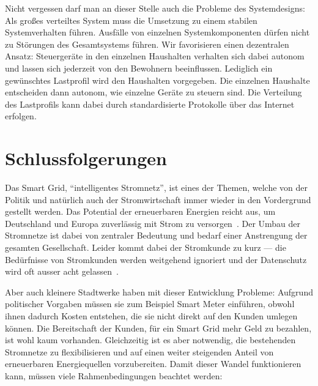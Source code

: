 \documentclass[12pt,BCOR=8.5mm]{scrartcl}
\begin{document}
Nicht vergessen darf man an dieser Stelle auch die Probleme des Systemdesigns:
Als großes verteiltes System muss die Umsetzung zu einem stabilen
Systemverhalten führen. Ausfälle von einzelnen Systemkomponenten dürfen
nicht zu Störungen des Gesamtsystems führen.  Wir favorisieren 
einen dezentralen Ansatz: Steuergeräte in den einzelnen Haushalten
verhalten sich dabei autonom und lassen sich jederzeit von den Bewohnern
beeinflussen. Lediglich ein gewünschtes Lastprofil wird
den Haushalten vorgegeben. Die einzelnen Haushalte entscheiden dann
autonom, wie einzelne Geräte zu steuern sind.  Die Verteilung des
Lastprofils kann dabei durch standardisierte Protokolle über das
Internet erfolgen.

\section{Schlussfolgerungen}
Das Smart Grid, "`intelligentes Stromnetz"', ist eines der Themen, welche
von der Politik und natürlich auch der Stromwirtschaft immer wieder in
den Vordergrund gestellt werden. Das Potential der erneuerbaren Energien
reicht aus, um Deutschland und Europa zuverlässig mit Strom zu
versorgen~\cite{sachverst10erneuerbar}. Der Umbau der Stromnetze ist
dabei von zentraler Bedeutung und bedarf einer Anstrengung der gesamten
Gesellschaft. Leider kommt dabei der Stromkunde zu
kurz --- die Bedürfnisse von Stromkunden werden weitgehend ignoriert und
der Datenschutz wird oft ausser acht gelassen~\cite{web:bmwinutzerschutz}.

Aber auch kleinere Stadtwerke haben mit dieser Entwicklung Probleme:
Aufgrund politischer Vorgaben müssen sie zum Beispiel Smart Meter
einführen, obwohl ihnen dadurch Kosten entstehen, die sie nicht direkt
auf den Kunden umlegen können. Die Bereitschaft der Kunden, für ein
Smart Grid mehr Geld zu bezahlen, ist wohl kaum vorhanden. Gleichzeitig
ist es aber notwendig, die bestehenden Stromnetze zu flexibilisieren und
auf einen weiter steigenden Anteil von erneuerbaren Energiequellen
vorzubereiten. Damit dieser Wandel funktionieren kann, müssen viele
Rahmenbedingungen beachtet werden:
\end{document}
